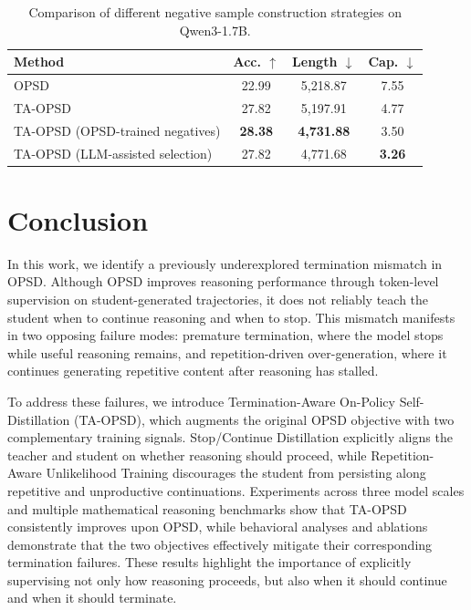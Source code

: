 \documentclass{article} %
\begin{document}
\begin{table}[h]
\centering
\caption{Comparison of different negative sample construction strategies on Qwen3-1.7B.}
\label{tab:trained-policy-mining}
\setlength{\tabcolsep}{5pt}
\begin{tabular}{lccc}
\toprule
Method & Acc. $\uparrow$ & Length $\downarrow$ & Cap. $\downarrow$ \\
\midrule
OPSD & 22.99 & 5,218.87 & 7.55 \\
TA-OPSD & 27.82 & 5,197.91 & 4.77 \\
TA-OPSD (OPSD-trained negatives) & \textbf{28.38} & \textbf{4,731.88} & 3.50 \\
TA-OPSD (LLM-assisted selection) & 27.82 & 4,771.68 & \textbf{3.26} \\
\bottomrule
\end{tabular}
\end{table}

\section{Conclusion}
\label{sec:conclusion}
In this work, we identify a previously underexplored termination mismatch in OPSD. Although OPSD improves reasoning performance through token-level supervision on student-generated trajectories, it does not reliably teach the student when to continue reasoning and when to stop. This mismatch manifests in two opposing failure modes: premature termination, where the model stops while useful reasoning remains, and repetition-driven over-generation, where it continues generating repetitive content after reasoning has stalled.

To address these failures, we introduce Termination-Aware On-Policy Self-Distillation (TA-OPSD), which augments the original OPSD objective with two complementary training signals. Stop/Continue Distillation explicitly aligns the teacher and student on whether reasoning should proceed, while Repetition-Aware Unlikelihood Training discourages the student from persisting along repetitive and unproductive continuations. Experiments across three model scales and multiple mathematical reasoning benchmarks show that TA-OPSD consistently improves upon OPSD, while behavioral analyses and ablations demonstrate that the two objectives effectively mitigate their corresponding termination failures. 
These results highlight the importance of explicitly supervising not only how reasoning proceeds, but also when it should continue and when it should terminate.
\end{document}
